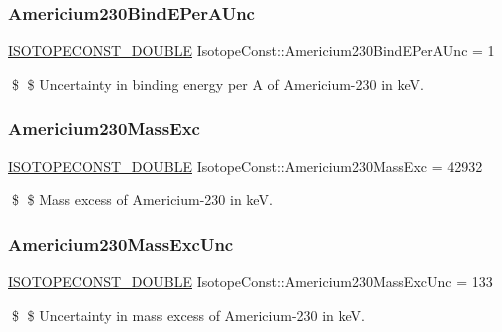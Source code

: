 \subsubsection{\texorpdfstring{Americium230\+Bind\+E\+Per\+A\+Unc}{Americium230BindEPerAUnc}}
{\footnotesize\ttfamily \mbox{\hyperlink{group___isotope_const-_macros_ga8f45a7272ce02c0b4c65c44636ed719a}{I\+S\+O\+T\+O\+P\+E\+C\+O\+N\+S\+T\+\_\+\+D\+O\+U\+B\+LE}} Isotope\+Const\+::\+Americium230\+Bind\+E\+Per\+A\+Unc = 1}

\$ \$ Uncertainty in binding energy per A of Americium-\/230 in keV. \mbox{\label{group___isotope_const-_americium-_am230_gaa8c6e1cd1aae037053b56e90895d6d0a}} 
\subsubsection{\texorpdfstring{Americium230\+Mass\+Exc}{Americium230MassExc}}
{\footnotesize\ttfamily \mbox{\hyperlink{group___isotope_const-_macros_ga8f45a7272ce02c0b4c65c44636ed719a}{I\+S\+O\+T\+O\+P\+E\+C\+O\+N\+S\+T\+\_\+\+D\+O\+U\+B\+LE}} Isotope\+Const\+::\+Americium230\+Mass\+Exc = 42932}

\$ \$ Mass excess of Americium-\/230 in keV. \mbox{\label{group___isotope_const-_americium-_am230_gaa01de32f31188193c79a287f167ff726}} 
\subsubsection{\texorpdfstring{Americium230\+Mass\+Exc\+Unc}{Americium230MassExcUnc}}
{\footnotesize\ttfamily \mbox{\hyperlink{group___isotope_const-_macros_ga8f45a7272ce02c0b4c65c44636ed719a}{I\+S\+O\+T\+O\+P\+E\+C\+O\+N\+S\+T\+\_\+\+D\+O\+U\+B\+LE}} Isotope\+Const\+::\+Americium230\+Mass\+Exc\+Unc = 133}

\$ \$ Uncertainty in mass excess of Americium-\/230 in keV. \mbox{\label{group___isotope_const-_americium-_am230_gac71c01691b8b718ca0b8929709a78748}} 
